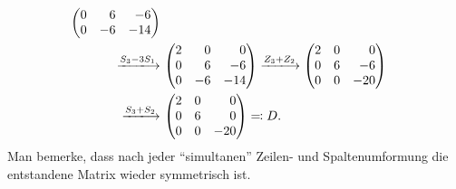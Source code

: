 \begin{align*}
\begin{pmatrix*}[r]
    0 &  6  &  -6 \\
    0 & -6  & -14 \\
  \end{pmatrix*}
  \\
  \xlongrightarrow{S_3 - 3 S_1}&\,
  \begin{pmatrix*}[r]
    2 &  0  &   0 \\ 
    0 &  6  &  -6 \\
    0 & -6  & -14 \\
  \end{pmatrix*}
  \xlongrightarrow{Z_3 + Z_2}
  \begin{pmatrix*}[r]
    2 & 0 &   0 \\ 
    0 & 6 &  -6 \\
    0 & 0 & -20 \\
  \end{pmatrix*}
  \\
  \xlongrightarrow{S_3 + S_2}&\,
  \begin{pmatrix*}[r]
    2 & 0 &   0 \\ 
    0 & 6 &   0 \\
    0 & 0 & -20 \\
  \end{pmatrix*}
  \eqqcolon
  D.
\end{align*}
Man bemerke, dass nach jeder \enquote{simultanen} Zeilen- und Spaltenumformung die entstandene Matrix wieder symmetrisch ist.


